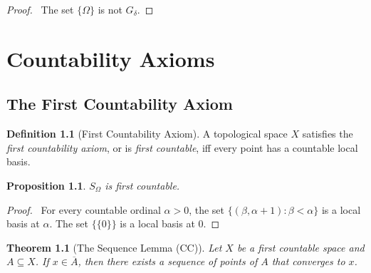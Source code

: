 \documentclass{report}
\let\qed\relax
\newtheorem{prop}[lm]{Proposition}
\newtheorem{thm}[lm]{Theorem}
\theoremstyle{definition}
\newtheorem{df}[lm]{Definition}
\begin{document}
 \begin{proof}
   \pf\ The set $\{ \Omega \}$ is not $G_\delta$. \qed
 \end{proof}

  \chapter{Countability Axioms}

  \section{The First Countability Axiom}

  \begin{df}[First Countability Axiom]
    A topological space $X$ satisfies the \emph{first countability axiom}, or
    is \emph{first countable}, iff every point has a countable local basis.
  \end{df}

   \begin{prop}
  $S_\Omega$ is first countable.
 \end{prop}

 \begin{proof}
   \pf\ For every countable ordinal $\alpha > 0$, the set $\{ (\beta, \alpha +
   1) :    \beta < \alpha \}$ is a local basis at $\alpha$. The set $\{ \{ 0
   \} \}$ is a local basis at 0. \qed
 \end{proof}

  \begin{thm}[The Sequence Lemma (CC)]
    Let $X$ be a first countable space and $A \subseteq X$. If $x \in
    \overline{A}$, then there exists a sequence of points of $A$ that converges
    to $x$.
  \end{thm}
\end{document}
